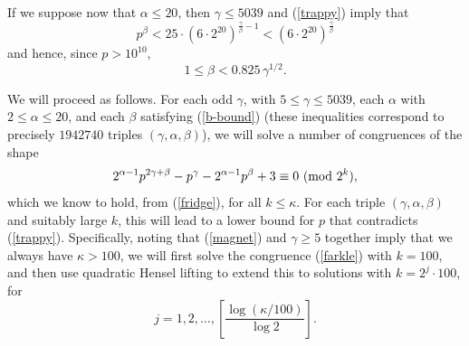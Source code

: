 \documentclass{amsart}
\def\mod#1{{\ifmmode\text{\rm\ (mod~$#1$)}
\else\discretionary{}{}{\hbox{ }}\rm(mod~$#1$)\fi}}
\begin{document}
{If we suppose now that $\alpha \leq 20$, then $\gamma \leq 5039$ and (\ref{trappy}) imply that
$$
p^\beta < 25 \cdot \left( 6 \cdot 2^{20} \right)^{\frac{\gamma}{\beta}-1} < \left( 6 \cdot 2^{20} \right)^{\frac{\gamma}{\beta}} 
$$
and hence,
since $p > 10^{10}$, 
\begin{equation} \label{b-bound}
1 \leq \beta < 0.825 \, \gamma^{1/2}.
\end{equation}

We will proceed as follows. For each odd $\gamma$,  with $5 \leq \gamma \leq 5039$, each $\alpha$ with $2 \leq \alpha \leq 20$, and each $\beta$ satisfying (\ref{b-bound}) (these inequalities correspond to precisely $1942740$ triples $(\gamma,\alpha,\beta)$), we will solve a number of congruences of the shape
\begin{equation} \label{farkle}
2^{\alpha-1} p^{2\gamma+\beta} - p^\gamma - 2^{\alpha-1} p^\beta +3 \equiv 0 \mod{2^{k}},
\end{equation}
which we know to hold, from (\ref{fridge}), for all $k \leq \kappa$. For each triple $(\gamma,\alpha,\beta)$ and suitably large $k$, this will lead to a lower bound for $p$ that contradicts (\ref{trappy}). Specifically, noting that (\ref{magnet}) and $\gamma \geq 5$ together imply that we always have $\kappa >100$, we will first solve the congruence (\ref{farkle}) with $k=100$, and then use quadratic Hensel lifting to extend this to solutions with $k=2^j \cdot 100$, for 
$$
j = 1, 2, \ldots, \left[ \frac{\log (\kappa/100)}{\log 2} \right].
$$

}
\end{document}
